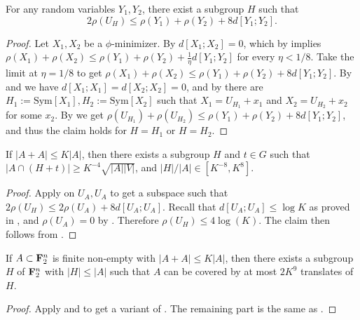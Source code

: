 \begin{proposition} \label{pfr-rho} For any random variables $Y_1,Y_2$, there exist a subgroup $H$ such that
  $$ 2\rho(U_H) \leq \rho(Y_1) + \rho(Y_2) + 8 d[Y_1;Y_2].$$
\end{proposition}
\begin{proof}
Let $X_1,X_2$ be a $\phi$-minimizer. By  $d[X_1;X_2]=0$, which by  implies $\rho(X_1)+\rho(X_2)\le \rho(Y_1) + \rho(Y_2) + \frac{1}{\eta} d[Y_1;Y_2]$ for every $\eta<1/8$. Take the limit at $\eta=1/8$ to get $\rho(X_1)+\rho(X_2)\le \rho(Y_1) + \rho(Y_2) + 8 d[Y_1;Y_2]$.
By  and  we have $d[X_1;X_1]=d[X_2;X_2]=0$, and by  there are $H_1:=\mathrm{Sym}[X_1],H_2:=\mathrm{Sym}[X_2]$ such that $X_1=U_{H_1}+x_1$ and $X_2=U_{H_2}+x_2$ for some $x_2$.
By  we get $\rho(U_{H_1})+\rho(U_{H_2})\le \rho(Y_1) + \rho(Y_2) + 8 d[Y_1;Y_2]$, and thus the claim holds for $H=H_1$ or $H=H_2$.
\end{proof}

\begin{corollary}\label{pfr-9-aux}
If $|A+A| \leq K|A|$, then there exists a subgroup $H$ and $t\in G$ such that $|A \cap (H+t)| \geq K^{-4} \sqrt{|A||V|}$, and $|H|/|A|\in[K^{-8},K^8]$.
\end{corollary}
\begin{proof}
  Apply  on $U_A,U_A$ to get a subspace such that $2\rho(U_H)\le 2\rho(U_A)+8d[U_A;U_A]$. Recall that $d[U_A;U_A]\le \log K$ as proved in , and $\rho(U_A)=0$ by . Therefore $\rho(U_H)\le 4\log(K)$. The claim then follows from .
\end{proof}

\begin{theorem}[PFR with \texorpdfstring{$C=9$}{C=9}]  If $A \subset {\bf F}_2^n$ is finite non-empty with $|A+A| \leq K|A|$, then there exists a subgroup $H$ of ${\bf F}_2^n$ with $|H| \leq |A|$ such that $A$ can be covered by at most $2K^9$ translates of $H$.
\end{theorem}

\begin{proof}
Apply  and  to get a variant of . The remaining part is the same as .
\end{proof}
